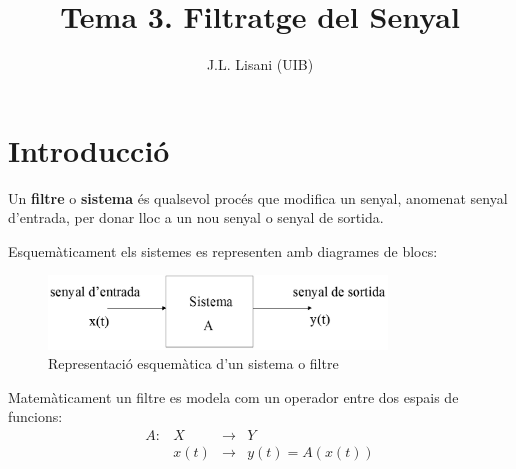 \documentclass{article}
\title{Tema 3. Filtratge del Senyal}
\author{{\small J.L. Lisani (UIB)}}
\date{}
\begin{document}
\maketitle

\tableofcontents

\section{Introducci\'o}
Un {\bf filtre} o {\bf sistema} \'es qualsevol proc\'es que modifica un senyal, 
anomenat senyal d'entrada, per donar lloc a un nou senyal o senyal de sortida.

Esquem\`aticament els sistemes es representen amb diagrames de blocs:

\begin{figure}[htbp]
\begin{center}
\includegraphics[width=9cm]{imatges/sistemaB.eps}
\caption{Representaci\'o esquem\`atica d'un sistema o filtre}
\label{sistema.fig}
\end{center}
\end{figure}

Matem\`aticament un filtre es modela com un operador entre dos espais de funcions:
\[
\begin{array}{crcl}
 A: & X & \longrightarrow & Y\\
    & x(t) & \longrightarrow & y(t)=A(x(t))
\end{array}
\]
\end{document}
